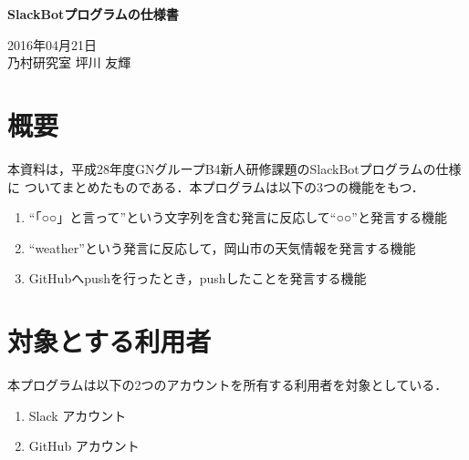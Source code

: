 \documentclass[fleqn, 14pt]{sty/extarticlej}
\begin{document}
\begin{center}
{\Large {\bf SlackBotプログラムの仕様書}}

\end{center}
\begin{flushright}
2016年04月21日\\

乃村研究室 坪川 友輝
\end{flushright}
\section{概要}
本資料は，平成28年度GNグループB4新人研修課題のSlackBotプログラムの仕様に
ついてまとめたものである．本プログラムは以下の3つの機能をもつ．
\begin{enumerate}
\item ``「○○」と言って''という文字列を含む発言に反応して``○○''と発言する機能
\item ``weather''という発言に反応して，岡山市の天気情報を発言する機能
\item GitHubへpushを行ったとき，pushしたことを発言する機能
\end{enumerate}


\section{対象とする利用者}
本プログラムは以下の2つのアカウントを所有する利用者を対象としている．
\begin{enumerate}
 \item Slack アカウント
 \item GitHub アカウント
\end{enumerate}

\end{document}
